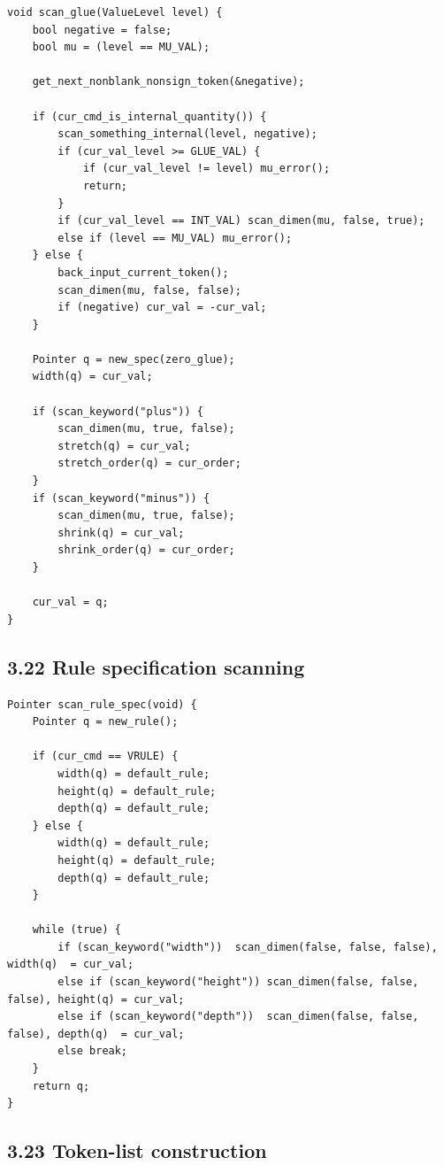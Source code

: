 \documentclass[11pt]{article}
\begin{document}
\begin{verbatim}
void scan_glue(ValueLevel level) {
    bool negative = false;
    bool mu = (level == MU_VAL);

    get_next_nonblank_nonsign_token(&negative);

    if (cur_cmd_is_internal_quantity()) {
        scan_something_internal(level, negative);
        if (cur_val_level >= GLUE_VAL) {
            if (cur_val_level != level) mu_error();
            return;
        }
        if (cur_val_level == INT_VAL) scan_dimen(mu, false, true);
        else if (level == MU_VAL) mu_error();
    } else {
        back_input_current_token();
        scan_dimen(mu, false, false);
        if (negative) cur_val = -cur_val;
    }

    Pointer q = new_spec(zero_glue);
    width(q) = cur_val;

    if (scan_keyword("plus")) {
        scan_dimen(mu, true, false);
        stretch(q) = cur_val;
        stretch_order(q) = cur_order;
    }
    if (scan_keyword("minus")) {
        scan_dimen(mu, true, false);
        shrink(q) = cur_val;
        shrink_order(q) = cur_order;
    }

    cur_val = q;
}
\end{verbatim}

\subsection{3.22 Rule specification
scanning}\label{rule-specification-scanning}

\begin{verbatim}
Pointer scan_rule_spec(void) {
    Pointer q = new_rule();

    if (cur_cmd == VRULE) {
        width(q) = default_rule;
        height(q) = default_rule;
        depth(q) = default_rule;
    } else {
        width(q) = default_rule;
        height(q) = default_rule;
        depth(q) = default_rule;
    }

    while (true) {
        if (scan_keyword("width"))  scan_dimen(false, false, false), width(q)  = cur_val;
        else if (scan_keyword("height")) scan_dimen(false, false, false), height(q) = cur_val;
        else if (scan_keyword("depth"))  scan_dimen(false, false, false), depth(q)  = cur_val;
        else break;
    }
    return q;
}
\end{verbatim}

\subsection{3.23 Token-list construction}\label{token-list-construction}
\end{document}
